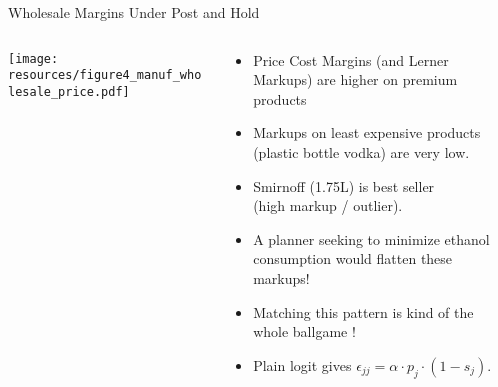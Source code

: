 \begin{frame}{Wholesale Margins Under Post and Hold}
\begin{columns}[T]
\begin{column}{.5\textwidth}
\begin{center}
\texttt{[image: resources/figure4\_manuf\_wholesale\_price.pdf]}
\end{center}
\end{column}
\hfill
\begin{column}{.5\textwidth}
  \begin{itemize}
  \item Price Cost Margins (and Lerner Markups) are higher on premium products
  \item Markups on least expensive products (plastic bottle vodka) are very low.
  \item Smirnoff (1.75L) is best seller\\ (high markup / outlier).
  \item A planner seeking to minimize ethanol consumption would flatten these markups!
  \item Matching this pattern is kind of the whole ballgame !
  \item Plain logit gives $\epsilon_{jj} = \alpha \cdot p_j  \cdot (1-s_j)$.
  \end{itemize}
  \end{column}
\end{columns}
\end{frame}




